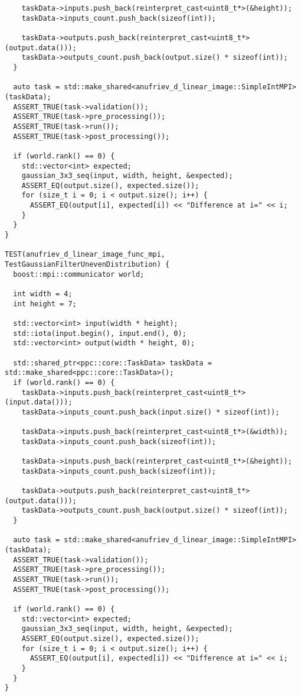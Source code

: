 \documentclass[12pt]{article}
\begin{document}
\begin{lstlisting}
    taskData->inputs.push_back(reinterpret_cast<uint8_t*>(&height));
    taskData->inputs_count.push_back(sizeof(int));

    taskData->outputs.push_back(reinterpret_cast<uint8_t*>(output.data()));
    taskData->outputs_count.push_back(output.size() * sizeof(int));
  }

  auto task = std::make_shared<anufriev_d_linear_image::SimpleIntMPI>(taskData);
  ASSERT_TRUE(task->validation());
  ASSERT_TRUE(task->pre_processing());
  ASSERT_TRUE(task->run());
  ASSERT_TRUE(task->post_processing());

  if (world.rank() == 0) {
    std::vector<int> expected;
    gaussian_3x3_seq(input, width, height, &expected);
    ASSERT_EQ(output.size(), expected.size());
    for (size_t i = 0; i < output.size(); i++) {
      ASSERT_EQ(output[i], expected[i]) << "Difference at i=" << i;
    }
  }
}

TEST(anufriev_d_linear_image_func_mpi, TestGaussianFilterUnevenDistribution) {
  boost::mpi::communicator world;

  int width = 4;
  int height = 7;

  std::vector<int> input(width * height);
  std::iota(input.begin(), input.end(), 0);
  std::vector<int> output(width * height, 0);

  std::shared_ptr<ppc::core::TaskData> taskData = std::make_shared<ppc::core::TaskData>();
  if (world.rank() == 0) {
    taskData->inputs.push_back(reinterpret_cast<uint8_t*>(input.data()));
    taskData->inputs_count.push_back(input.size() * sizeof(int));

    taskData->inputs.push_back(reinterpret_cast<uint8_t*>(&width));
    taskData->inputs_count.push_back(sizeof(int));

    taskData->inputs.push_back(reinterpret_cast<uint8_t*>(&height));
    taskData->inputs_count.push_back(sizeof(int));

    taskData->outputs.push_back(reinterpret_cast<uint8_t*>(output.data()));
    taskData->outputs_count.push_back(output.size() * sizeof(int));
  }

  auto task = std::make_shared<anufriev_d_linear_image::SimpleIntMPI>(taskData);
  ASSERT_TRUE(task->validation());
  ASSERT_TRUE(task->pre_processing());
  ASSERT_TRUE(task->run());
  ASSERT_TRUE(task->post_processing());

  if (world.rank() == 0) {
    std::vector<int> expected;
    gaussian_3x3_seq(input, width, height, &expected);
    ASSERT_EQ(output.size(), expected.size());
    for (size_t i = 0; i < output.size(); i++) {
      ASSERT_EQ(output[i], expected[i]) << "Difference at i=" << i;
    }
  }
}
\end{lstlisting}
\end{document}
